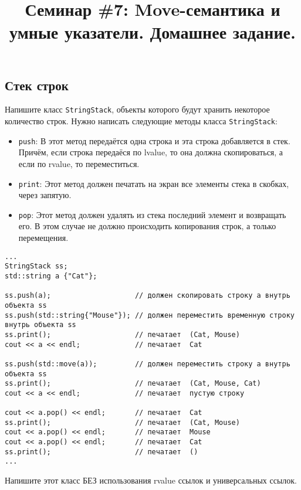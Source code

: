 \documentclass{article}
\begin{document}
\title{Семинар \#7: Move-семантика и умные указатели. Домашнее задание.\vspace{-5ex}}\date{}\maketitle

\subsection{Стек строк}
Напишите класс \texttt{StringStack}, объекты которого будут хранить некоторое количество строк.
Нужно написать следующие методы класса \texttt{StringStack}:

\begin{itemize}
\item \texttt{push}: В этот метод передаётся одна строка и эта строка добавляется в стек. Причём, если строка передаёся по lvalue, то она должна скопироваться, а если по rvalue, то переместиться.
\item \texttt{print}: Этот метод должен печатать на экран все элементы стека в скобках, через запятую.
\item \texttt{pop}: Этот метод должен удалять из стека последний элемент и возвращать его. В этом случае не должно происходить копирования строк, а только перемещения.
\end{itemize}

\begin{lstlisting}
...
StringStack ss;
std::string a {"Cat"};

ss.push(a);                    // должен скопировать строку a внутрь объекта ss
ss.push(std::string{"Mouse"}); // должен переместить временную строку внутрь объекта ss
ss.print();                    // печатает  (Cat, Mouse)
cout << a << endl;             // печатает  Cat

ss.push(std::move(a));         // должен переместить строку a внутрь объекта ss
ss.print();                    // печатает  (Cat, Mouse, Cat)
cout << a << endl;             // печатает  пустую строку

cout << a.pop() << endl;       // печатает  Cat
ss.print();                    // печатает  (Cat, Mouse)
cout << a.pop() << endl;       // печатает  Mouse
cout << a.pop() << endl;       // печатает  Cat
ss.print();                    // печатает  ()
...
\end{lstlisting}
Напишите этот класс БЕЗ использования rvalue ссылок и универсальных ссылок.
\end{document}
